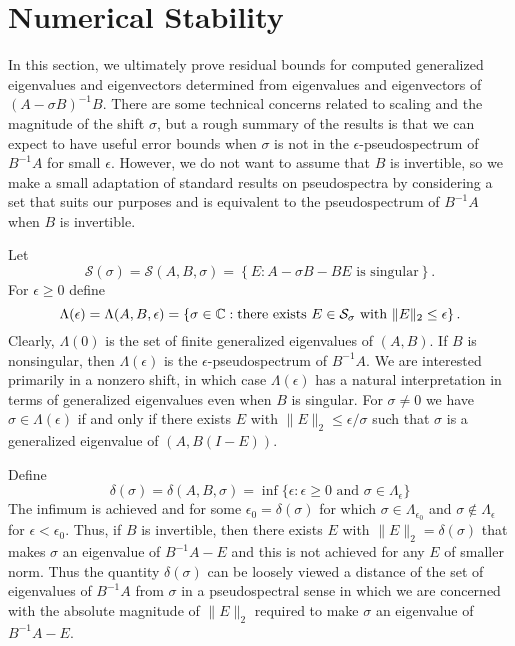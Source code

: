 \documentclass[12pt]{article}
\begin{document}
\section{Numerical Stability}
\label{sec:numerical-stability}

In this section, we ultimately prove residual bounds for computed
generalized eigenvalues and eigenvectors determined from eigenvalues
and eigenvectors of $(A-\sigma B)^{-1}B$.  There are some technical
concerns related to scaling and the magnitude of the shift $\sigma$,
but a rough summary of the results is that we can expect to have
useful error bounds when $\sigma$ is not in the
$\epsilon$-pseudospectrum of $B^{-1}A$ for small $\epsilon$.  However,
we do not want to assume that $B$ is invertible, so we make a small
adaptation of standard results on pseudospectra by considering a set
that suits our purposes and is equivalent to the pseudospectrum of
$B^{-1}A$ when $B$ is invertible.

Let
\begin{equation}
  \label{eq:S_def}
  \mathcal{S}(\sigma) =
  \mathcal{S}(A,B,\sigma) = 
  \left\{ E : \mbox{$A - \sigma B - B E$ is singular} \right\}.
\end{equation}
For $\epsilon \geq 0$ define
\begin{equation}
  \label{eq:pseudo_def}
  \Lambda(\epsilon) = \Lambda(A, B, \epsilon) =
  \left\{ \sigma \in {\mathbb C}: \mbox{there exists $E\in \mathcal{S}_\sigma$
      with $\|E\|_2\leq \epsilon$}
  \right\}.
\end{equation}
Clearly, $\Lambda(0)$ is the set of finite generalized eigenvalues of
$(A,B)$.  If $B$ is nonsingular, then $\Lambda(\epsilon)$ is the
$\epsilon$-pseudospectrum of $B^{-1} A$.  We are interested primarily
in a nonzero shift, in which case $\Lambda(\epsilon)$ has a natural
interpretation in terms of generalized eigenvalues even when $B$ is
singular.  For $\sigma \neq 0$ we have $\sigma\in\Lambda(\epsilon)$ if
and only if there exists $E$ with $\|E\|_2 \leq \epsilon/\sigma$ such
that $\sigma$ is a generalized eigenvalue of $(A, B(I-E))$.

Define
\begin{equation}
  \label{eq:delta_def}
  \delta(\sigma) = \delta(A, B, \sigma) = \inf \{ \epsilon :
  \mbox{$\epsilon \geq 0$ and $\sigma \in \Lambda_\epsilon$}\}
\end{equation}
The infimum is achieved and for some $\epsilon_0 =\delta(\sigma)$ for
which $\sigma \in \Lambda_{\epsilon_0}$ and
$\sigma \notin \Lambda_{\epsilon}$ for $\epsilon < \epsilon_0$.  Thus,
if $B$ is invertible, then there exists $E$ with
$\|E\|_2 = \delta(\sigma)$ that makes $\sigma$ an eigenvalue of
$B^{-1}A - E$ and this is not achieved for any $E$ of smaller norm.
Thus the quantity $\delta(\sigma)$ can be loosely viewed a distance of
the set of eigenvalues of $B^{-1}A$ from $\sigma$ in a pseudospectral
sense in which we are concerned with the absolute magnitude of
$\|E\|_2$ required to make $\sigma$ an eigenvalue of $B^{-1}A - E$.
\end{document}
